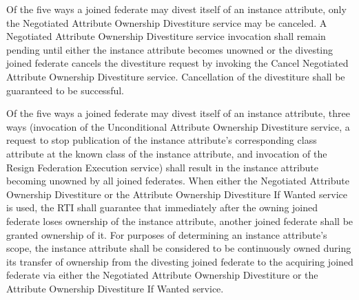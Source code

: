 \begin{compactstdpage}


    Of the five ways a joined federate may divest itself of an instance attribute, only the Negotiated Attribute Ownership Divestiture service may be canceled. A Negotiated Attribute Ownership Divestiture service invocation shall remain pending until either the instance attribute becomes unowned or the divesting joined federate cancels the divestiture request by invoking the Cancel Negotiated Attribute Ownership Divestiture service. Cancellation of the divestiture shall be guaranteed to be successful.


    Of the five ways a joined federate may divest itself of an instance attribute, three ways (invocation of the Unconditional Attribute Ownership Divestiture service, a request to stop publication of the instance attribute's corresponding class attribute at the known class of the instance attribute, and invocation of the Resign Federation Execution service) shall result in the instance attribute becoming unowned by all joined federates. When either the Negotiated Attribute Ownership Divestiture or the Attribute Ownership Divestiture If Wanted service is used, the RTI shall guarantee that immediately after the owning joined federate loses ownership of the instance attribute, another joined federate shall be granted ownership of it. For purposes of determining an instance attribute's scope, the instance attribute shall be considered to be continuously owned during its transfer of ownership from the divesting joined federate to the acquiring joined federate via either the Negotiated Attribute Ownership Divestiture or the Attribute Ownership Divestiture If Wanted service.

\end{compactstdpage}

